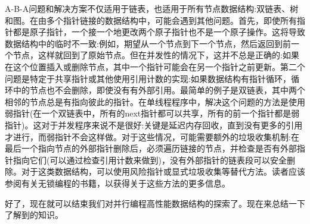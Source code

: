 A-B-A问题和解决方案不仅适用于链表，也适用于所有节点数据结构:双链表、树和图。在由多个指针链接的数据结构中，可能会遇到其他问题。首先，即使所有指针都是原子指针，一个接一个地更改两个原子指针也不是一个原子操作。这将导致数据结构中的临时不一致:例如，期望从一个节点到下一个节点，然后返回到前一个节点，这样就回到了原始节点。但在并发性的情况下，这并不总是正确的:如果在这个位置插入或删除节点，其中一个指针可能会在另一个指针之前更新。第二个问题是特定于共享指针或其他使用引用计数的实现:如果数据结构有指针循环，循环中的节点也不会删除，即使没有有外部引用。最简单的例子是双链表，其中两个相邻的节点总是有指向彼此的指针。在单线程程序中，解决这个问题的方法是使用弱指针(在一个双链表中，所有的next指针都可以共享，所有的前一个指针都是弱指针)。这对于并发程序来说不是很好:关键是延迟内存回收，直到没有更多的引用才进行，而弱指针不会这样做。对于这些情况，可能需要额外的垃圾收集机制:在最后一个指向节点的外部指针删除后，必须遍历链接的节点，并检查是否有外部指针指向它们(可以通过检查引用计数来做到)，没有外部指针的链表段可以安全删除。对于这类数据结构，可以使用风险指针或显式垃圾收集等替代方法。读者应该参阅有关无锁编程的书籍，以获得关于这些方法的更多信息。

好了，现在就可以结束我们对并行编程高性能数据结构的探索了。现在来总结一下了解到的知识。













